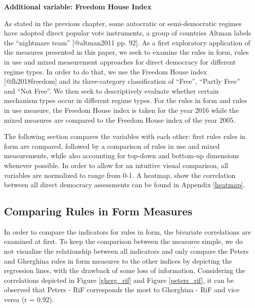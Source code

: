 \documentclass[]{article}
\begin{document}
\textbf{Additional variable: Freedom House Index}

As stated in the previous chapter, some autocratic or semi-democratic
regimes have adopted direct popular vote instruments, a group of
countries Altman labels the ``nightmare team'' {[}@altman2011 pp. 92{]}.
As a first exploratory application of the measures presented in this
paper, we seek to examine the rules in form, rules in use and mixed
measurement approaches for direct democracy for different regime types.
In order to do that, we use the Freedom House index {[}@fh2018freedom{]}
and its three-category classification of ``Free'', ``Partly Free'' and
``Not Free''. We then seek to descriptively evaluate whether certain
mechanism types occur in different regime types. For the rules in form
and rules in use measure, the Freedom House index is taken for the year
2016 while the mixed measures are compared to the Freedom House index of
the year 2005.

The following section compares the variables with each other: first
rules rules in form are compared, followed by a comparison of rules in
use and mixed measurements, while also accounting for top-down and
bottom-up dimensions whenever possible. In order to allow for an
intuitive visual comparison, all variables are normalized to range from
0-1. A heatmap, show the correlation between all direct democracy
assessments can be found in Appendix \ref{heatmap}.

\subsection{Comparing Rules in Form Measures} \label{rif_empiric}

In order to compare the indicators for rules in form, the bivariate
correlations are examined at first. To keep the comparison between the
measures simple, we do not visualize the relationship between all
indicators and only compare the Peters and Gherghina rules in form
measures to the other indices by depicting the regression lines, with
the drawback of some loss of information. Considering the correlations
depicted in Figure \ref{gherg_rif} and Figure \ref{peters_rif}, it can
be observed that Peters - RiF corresponds the most to Gherghina - RiF
and vice versa (r = 0.92).
\end{document}
